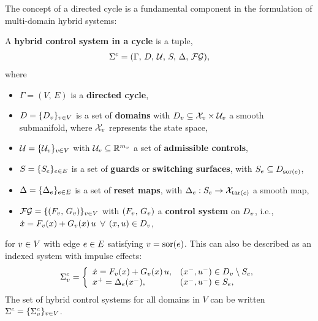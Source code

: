 The concept of a directed cycle is a fundamental component in the formulation
of multi-domain hybrid systems:

\begin{definition} \label{def:hcs}
  A {\bf hybrid control system in a cycle} is a tuple,
  \begin{align*}
    \Sigma^{c} = (\Gamma, \, D, \, \mathcal{U}, \, S, \, \Delta, \, \mathcal{FG}),
  \end{align*}
  where
  \begin{itemize}
  \item $\Gamma = (V, \, E)$ is a {\bf directed cycle},
  \item $D = \{D_{v}\}_{v \in V}$ is a set of {\bf domains} with $D_{v}
    \subseteq \mathcal{X}_{v} \times \mathcal{U}_{v}$ a smooth submanifold, where $\mathcal{X}_{v}$ represents the
    state space,
  \item $\mathcal{U} = \{\mathcal{U}_{v}\}_{v \in V}$ with $\mathcal{U}_{v} \subseteq \mathbb{R}^{m_{v}}$ a set of
    {\bf admissible controls},
  \item $S = \{S_{e}\}_{e \in E}$ is a set of {\bf guards} or {\bf
      switching surfaces}, with $S_{e} \subseteq D_{\mathrm{sor}(e)}$,
  \item $\Delta = \{\Delta_{e}\}_{e \in E}$ is a set of {\bf reset maps}, with
    $\Delta_{e} : S_{e} \to \mathcal{X}_{\mathrm{tar}(e)}$ a smooth map,
  \item $\mathcal{FG} = \{(F_{v}, \, G_{v})\}_{v \in V}$ with $(F_{v}, \, G_{v})$ a {\bf control
      system} on $D_{v}$, i.e., ${\dot {x}} = F_{v}(x) + G_{v}(x) \, u$ $\forall$
    $(x, u) \in D_{v}$,
  \end{itemize}
  for $v \in V$ with edge $e \in E$ satisfying $v = \mathrm{sor}(e)$.
  This can also be described as an indexed system with impulse effects:
  \begin{align}
    \label{eq:HCSi}
    \Sigma^{c}_{v} = \left\{
      \begin{array}{l l}
        {\dot {x}} = F_{v}(x) + G_{v}(x) \, u, & (x^{-}, u^{-}) \in D_{v} \setminus
        S_{e},\\
        x^{+} = \Delta_{e}(x^{-}), & (x^{-}, u^{-}) \in S_{e},
      \end{array}\right.
  \end{align}
  The set of hybrid control systems for all domains in $V$ can be written $\Sigma^{c}
  = \{\Sigma^{c}_{v}\}_{v \in V}$.
\end{definition}

